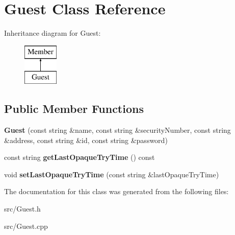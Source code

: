 \hypertarget{class_guest}{}\section{Guest Class Reference}
\label{class_guest}
Inheritance diagram for Guest\+:\begin{figure}[H]
\begin{center}
\leavevmode
\includegraphics[height=2.000000cm]{class_guest}
\end{center}
\end{figure}
\subsection*{Public Member Functions}
\begin{DoxyCompactItemize}
\item 
\mbox{\label{class_guest_a16883a872c23d3b57c330a8c18031795}} 
{\bfseries Guest} (const string \&name, const string \&security\+Number, const string \&address, const string \&id, const string \&password)
\item 
\mbox{\label{class_guest_a9d8fc5c2d74eb419edb0c0ad1f16a73e}} 
const string {\bfseries get\+Last\+Opaque\+Try\+Time} () const
\item 
\mbox{\label{class_guest_a89ceffdfdbf729a0e2ae3592459fcae6}} 
void {\bfseries set\+Last\+Opaque\+Try\+Time} (const string \&last\+Opaque\+Try\+Time)
\end{DoxyCompactItemize}


The documentation for this class was generated from the following files\+:\begin{DoxyCompactItemize}
\item 
src/Guest.\+h\item 
src/Guest.\+cpp\end{DoxyCompactItemize}

